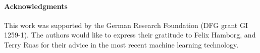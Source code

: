 
\paragraph{Acknowledgments} This work was supported by the German Research Foundation (DFG grant GI 1259-1).
The authors would like to express their gratitude to Felix Hamborg, and Terry Ruas for their advice in the most recent machine learning technology.
\printbibliography[keyword=primary]
